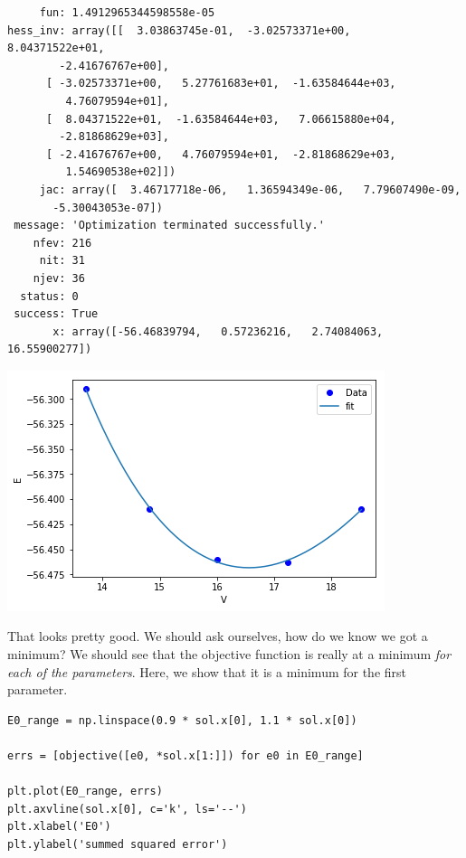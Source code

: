 \documentclass[11pt]{article}
\begin{document}
\begin{verbatim}
     fun: 1.4912965344598558e-05
hess_inv: array([[  3.03863745e-01,  -3.02573371e+00,   8.04371522e+01,
        -2.41676767e+00],
      [ -3.02573371e+00,   5.27761683e+01,  -1.63584644e+03,
         4.76079594e+01],
      [  8.04371522e+01,  -1.63584644e+03,   7.06615880e+04,
        -2.81868629e+03],
      [ -2.41676767e+00,   4.76079594e+01,  -2.81868629e+03,
         1.54690538e+02]])
     jac: array([  3.46717718e-06,   1.36594349e-06,   7.79607490e-09,
       -5.30043053e-07])
 message: 'Optimization terminated successfully.'
    nfev: 216
     nit: 31
    njev: 36
  status: 0
 success: True
       x: array([-56.46839794,   0.57236216,   2.74084063,  16.55900277])

\end{verbatim}




\begin{center}
\includegraphics[width=.9\linewidth]{obipy-resources/513154bd4a2746455cb8d249e9b62785-85168WQx.png}
\end{center}

That looks pretty good. We should ask ourselves, how do we know we got a minimum? We should see that the objective function is really at a minimum \emph{for each of the parameters}. Here, we show that it is a minimum for the first parameter.

\begin{verbatim}
E0_range = np.linspace(0.9 * sol.x[0], 1.1 * sol.x[0])

errs = [objective([e0, *sol.x[1:]]) for e0 in E0_range]

plt.plot(E0_range, errs)
plt.axvline(sol.x[0], c='k', ls='--')
plt.xlabel('E0')
plt.ylabel('summed squared error')
\end{verbatim}
\end{document}
